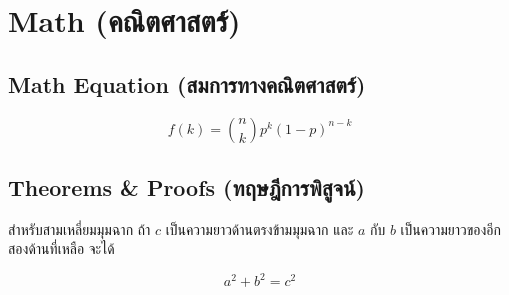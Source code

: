 \documentclass[
]{article}\usepackage{amsmath,amssymb}
\begin{document}
\hypertarget{math}{%
\section{Math (คณิตศาสตร์)}\label{math}}

\hypertarget{math-equation-uxe2auxe21uxe01uxe32uxe23uxe17uxe32uxe07uxe04uxe13uxe15uxe28uxe32uxe2auxe15uxe23}{%
\subsection{Math Equation
(สมการทางคณิตศาสตร์)}\label{math-equation-uxe2auxe21uxe01uxe32uxe23uxe17uxe32uxe07uxe04uxe13uxe15uxe28uxe32uxe2auxe15uxe23}}

\begin{equation}
  f\left(k\right) = \binom{n}{k} p^k\left(1-p\right)^{n-k}
\end{equation}

\hypertarget{theorems-proofs-uxe17uxe24uxe29uxe0euxe01uxe32uxe23uxe1euxe2auxe08uxe19}{%
\subsection{Theorems \& Proofs
(ทฤษฎีการพิสูจน์)}\label{theorems-proofs-uxe17uxe24uxe29uxe0euxe01uxe32uxe23uxe1euxe2auxe08uxe19}}

\leavevmode{}%
สำหรับสามเหลี่ยมมุมฉาก ถ้า \(c\) เป็นความยาวด้านตรงข้ามมุมฉาก และ \(a\) กับ \(b\)
เป็นความยาวของอีกสองด้านที่เหลือ จะได้

\[a^2 + b^2 = c^2\]
\end{document}
